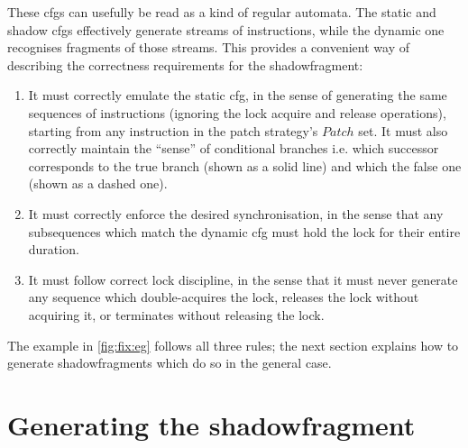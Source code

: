 These \glspl{cfg} can usefully be read as a kind of regular automata.
The static and shadow \glspl{cfg} effectively generate streams of
instructions, while the dynamic one recognises fragments of those
streams.  This provides a convenient way of describing the correctness
requirements for the \gls{shadowfragment}:
\begin{enumerate}
\item It must correctly emulate the static \gls{cfg}, in the sense of
  generating the same sequences of instructions (ignoring the lock
  acquire and release operations), starting from any instruction in
  the patch strategy's $\mathit{Patch}$ set.  It must also correctly
  maintain the ``sense'' of conditional branches i.e. which successor
  corresponds to the true branch (shown as a solid line) and which the
  false one (shown as a dashed one).
\item It must correctly enforce the desired synchronisation, in the
  sense that any subsequences which match the dynamic \gls{cfg} must
  hold the lock for their entire duration.
\item It must follow correct lock discipline, in the sense that it
  must never generate any sequence which double-acquires the lock,
  releases the lock without acquiring it, or terminates without
  releasing the lock.
\end{enumerate}
The example in \autoref{fig:fix:eg} follows all three rules; the next
section explains how to generate \glspl{shadowfragment} which do so in
the general case.

\section{Generating the \protect\gls{shadowfragment}}

